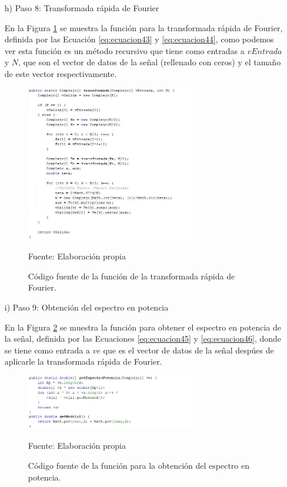 \begin{enumerate}
\item[h)]Paso 8: Transformada rápida de Fourier
\par
En la Figura \ref{fig:figura3.23} se muestra la función para la transformada rápida de Fourier, definida por las Ecuación \eqref{eq:ecuacion43} y \eqref{eq:ecuacion44}, como podemos ver esta función es un método recursivo que tiene como entradas a $vEntrada$ y $N$, que son el vector de datos de la señal (rellenado con ceros) y el tamaño de este vector respectivamente.
\begin{figure}[H]
\captionsetup{justification=centering}
\begin{center}
\includegraphics[width=0.7\textwidth]{Imagenes/Cap3/image023}
\end{center}
\begin{center}
\vskip -0.5cm
\caption{\small{Código fuente de la función de la transformada rápida de Fourier.}}
\label{fig:figura3.23}
{\small{Fuente: Elaboración propia}}
\end{center}
\end{figure}

\item[i)]Paso 9: Obtención del espectro en potencia
\par
En la Figura \ref{fig:figura3.24} se muestra la función  para obtener el espectro en potencia de la señal, definida por las Ecuaciones \eqref{eq:ecuacion45} y \eqref{eq:ecuacion46}, donde se tiene como entrada a $ve$ que es el vector de datos de la señal despúes de aplicarle la transformada rápida de Fourier.
\begin{figure}[H]
\captionsetup{justification=centering}
\begin{center}
\includegraphics[width=0.7\textwidth]{Imagenes/Cap3/image024}
\end{center}
\begin{center}
\vskip -0.5cm
\caption{\small{Código fuente de la función para la obtención del espectro en potencia.}}
\label{fig:figura3.24}
{\small{Fuente: Elaboración propia}}
\end{center}
\end{figure}


\end{enumerate}
